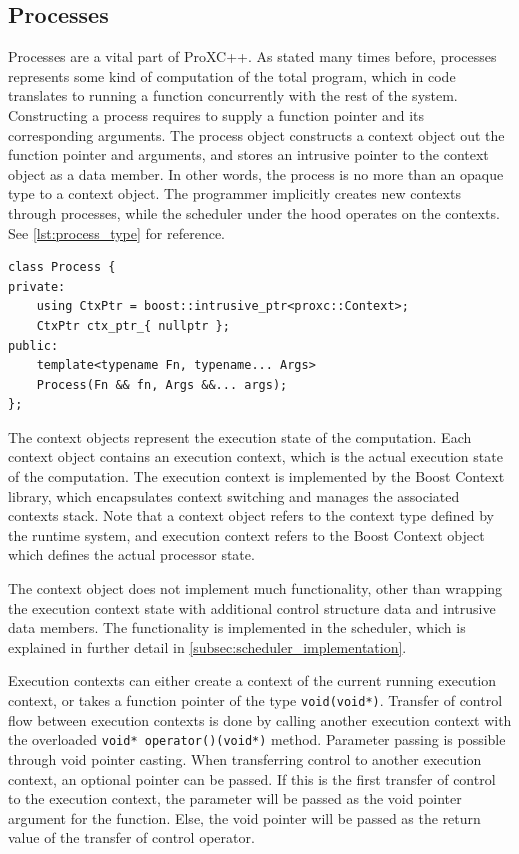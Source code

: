 \subsection{Processes}
\label{subsec:process_implementation}


Processes are a vital part of ProXC++. As stated many times before, processes represents some kind of computation of the total program, which in code translates to running a function concurrently with the rest of the system. Constructing a process requires to supply a function pointer and its corresponding arguments. The process object constructs a context object out the function pointer and arguments, and stores an intrusive pointer to the context object as a data member. In other words, the process is no more than an opaque type to a context object. The programmer implicitly creates new contexts through processes, while the scheduler under the hood operates on the contexts. See \cref{lst:process_type} for reference.

\begin{lstfloat}
\begin{lstlisting}[caption={Minimal process type.}, label={lst:process_type}, style={CustomC++}, xleftmargin={2em}]
class Process {
private:
    using CtxPtr = boost::intrusive_ptr<proxc::Context>;
    CtxPtr ctx_ptr_{ nullptr };
public:
    template<typename Fn, typename... Args>
    Process(Fn && fn, Args &&... args);
};
\end{lstlisting}
\end{lstfloat}

The context objects represent the execution state of the computation. Each context object contains an execution context, which is the actual execution state of the computation. The execution context is implemented by the Boost Context library, which encapsulates context switching and manages the associated contexts stack. Note that a context object refers to the context type defined by the runtime system, and execution context refers to the Boost Context object which defines the actual processor state.

The context object does not implement much functionality, other than wrapping the execution context state with additional control structure data and intrusive data members. The functionality is implemented in the scheduler, which is explained in further detail in \cref{subsec:scheduler_implementation}.

Execution contexts can either create a context of the current running execution context, or takes a function pointer of the type \lstinline[style={CustomC++}]|void(void*)|. Transfer of control flow between execution contexts is done by calling another execution context with the overloaded \lstinline[style={CustomC++}]|void* operator()(void*)| method. Parameter passing is possible through void pointer casting. When transferring control to another execution context, an optional pointer can be passed. If this is the first transfer of control to the execution context, the parameter will be passed as the void pointer argument for the function. Else, the void pointer will be passed as the return value of the transfer of control operator.

